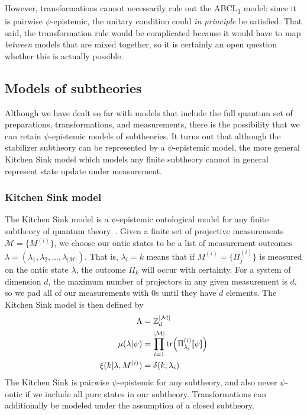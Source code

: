 \documentclass[%
 reprint, onecolumn, 12pt,
superscriptaddress,
nofootinbib,
 prx, 
]{quantumarticle}
\newcommand{\Z}{\mathbb{Z}}
\newcommand{\M}{\mathcal{M}}
\newcommand{\m}{{\left| \mathcal M \right |}}
\newcommand{\abclo}{{ABCL\textsubscript{1}} }
\newcommand{\proj}[1]{{\bm[}#1{\bm]}}
\begin{document}
However, transformations cannot necessarily rule out the \abclo model:
since it is pairwise $\psi$-epistemic, the unitary condition could
\emph{in principle} be satisfied. That said, the transformation rule
would be complicated because it would have to map \emph{between}
models that are mixed together, so it is certainly an open question
whether this is actually possible.


\subsection{Models of subtheories}
Although we have dealt so far with models that include the full
quantum set of preparations, transformations, and measurements, there
is the possibility that we can retain $\psi$-epistemic models of
subtheories. It turns out that although the stabilizer subtheory can
be represented by a $\psi$-epistemic model, the more general Kitchen
Sink model which models any finite subtheory cannot in general
represent state update under measurement.

\subsubsection{Kitchen Sink model}
\label{sec:kitchen-sink-model}
The Kitchen Sink model is a $\psi$-epistemic ontological model for any
finite subtheory of quantum
theory~\mbox{\cite[Section~IIIC]{HarriganRepresentingprobabilisticdata2007}}. Given
a finite set of projective measurements $\M=\{M^{(i)}\}$, we choose
our ontic states to be a list of measurement outcomes
$\lambda=(\lambda_1,\lambda_2,\ldots,\lambda_\m)$. That is,
$\lambda_i=k$ means that if $M^{(i)}=\{\Pi^{(i)}_j\}$ is measured on
the ontic state $\lambda$, the outcome $\Pi_k$ will occur with
certainty.  For a system of dimension $d$, the maximum number of
projectors in any given measurement is $d$, so we pad all of our
measurements with $0$s until they have $d$ elements. The Kitchen Sink
model is then defined by
\begin{align}
  \Lambda            & = \Z_d^\m\nonumber\\
  \mu(\lambda|\psi)  & =\prod_{i=1}^\m\tr(\Pi^{(i)}_{\lambda_i}\proj\psi) \nonumber\\
  \xi(k|\lambda,M^{(i)}) & = \delta(k,\lambda_i)                 
\end{align}
The Kitchen Sink is pairwise $\psi$-epistemic for any subtheory, and
also never $\psi$-ontic if we include all pure states in our
subtheory. Transformations can additionally be modeled under the
assumption of a closed subtheory. 
\end{document}
